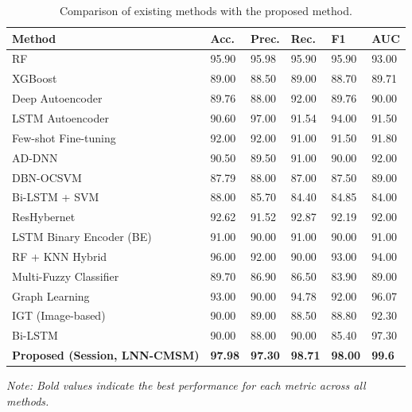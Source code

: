 \begin{table}[!ht]
\centering
\caption{Comparison of existing methods with the proposed method.}
\label{tab:sota_comparison}
\renewcommand{\arraystretch}{1.3} %
\setlength{\tabcolsep}{5pt}      %
\small
\begin{tabular}{|l|l|l|l|l|l|}
\hline
\textbf{Method} & \textbf{Acc.} & \textbf{Prec.} & \textbf{Rec.} & \textbf{F1} & \textbf{AUC} \\
\hline
RF \cite{manoharan2023insider} & 95.90 & 95.98 & 95.90 & 95.90 & 93.00 \\ \hline
XGBoost \cite{le2020analyzing} & 89.00 & 88.50 & 89.00 & 88.70 & 89.71 \\ \hline
Deep Autoencoder \cite{chattopadhyay2018scenario} & 89.76 & 88.00 & 92.00 & 89.76 & 90.00 \\ \hline
LSTM Autoencoder \cite{nasir2021behavioral} & 90.60 & 97.00 & 91.54 & 94.00 & 91.50 \\ \hline
Few-shot Fine-tuning \cite{yuan2020few} & 92.00 & 92.00 & 91.00 & 91.50 & 91.80 \\ \hline
AD-DNN \cite{al2021integrated} & 90.50 & 89.50 & 91.00 & 90.00 & 92.00 \\ \hline
DBN-OCSVM \cite{lin2017insider} & 87.79 & 88.00 & 87.00 & 87.50 & 89.00 \\ \hline
Bi-LSTM + SVM \cite{singh2023user} & 88.00 & 85.70 & 84.40 & 84.85 & 84.00 \\ \hline
ResHybernet \cite{hong2023graph} & 92.62 & 91.52 & 92.87 & 92.19 & 92.00 \\ \hline
LSTM Binary Encoder (BE) \cite{alslaiman2023enhancing} & 91.00 & 90.00 & 91.00 & 90.00 & 91.00 \\ \hline
RF + KNN Hybrid \cite{al2022new} & 96.00 & 92.00 & 90.00 & 93.00 & 94.00 \\ \hline
Multi-Fuzzy Classifier \cite{singh2022user} & 89.70 & 86.90 & 86.50 & 83.90 & 89.00 \\ \hline
Graph Learning \cite{cai2024lan} & 93.00 & 90.00 & 94.78 & 92.00 & 96.07 \\ \hline
IGT (Image-based) \cite{li2021image} & 90.00 & 89.00 & 88.50 & 88.80 & 92.30 \\ \hline
Bi-LSTM \cite{song2024britd} & 90.00 & 88.00 & 90.00 & 85.40 & 97.30 \\ \hline
\textbf{Proposed (Session, LNN-CMSM)} & \textbf{97.98} & \textbf{97.30} & \textbf{98.71} & \textbf{98.00} & \textbf{99.6} \\ \hline
\end{tabular}

\vspace{2mm}
\scriptsize{\textit{Note: Bold values indicate the best performance for each metric across all methods.}}
\end{table}

